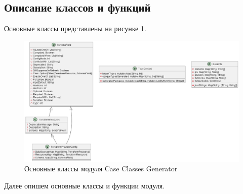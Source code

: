   \subsection{Описание классов и функций}

  Основные классы представлены на рисунке \ref{fig:uml1}.

  \begin{figure}[h]
    \centering
    \includegraphics[scale=0.35]{img/5.png}
    \caption{Основные классы модуля Case Classes Generator}
    \label{fig:uml1}
  \end{figure}

  \vspace{60mm}

  Далее опишем основные классы и функции модуля.

  

